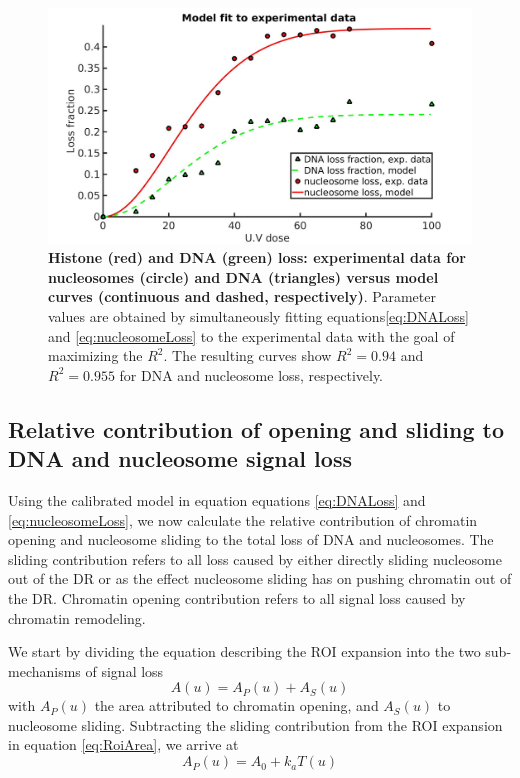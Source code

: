 \documentclass[12pt]{article}
\begin{document}
	
\begin{figure}[H]
\centering
\includegraphics[width=0.5\linewidth, height=0.3\textheight]{histoneAndDnaVsUvDoseModelFit}
\caption{\textbf{Histone (red) and DNA (green) loss: experimental data
	for nucleosomes (circle) and DNA (triangles) versus model curves
	(continuous and dashed, respectively)}. Parameter values are obtained
	by simultaneously fitting equations\eqref{eq:DNALoss}  and \eqref{eq:nucleosomeLoss} to the experimental data with
	the goal of maximizing the $R^2$. The resulting curves show $R^2 = 0.94$ and
	$R^2 = 0.955$ for DNA and nucleosome loss, respectively.}
\label{fig:histoneAndDnaVsUvDoseModelFit}
\end{figure}

\subsection{Relative contribution of opening and sliding to DNA
	and nucleosome signal loss}

Using the calibrated model in equation equations \eqref{eq:DNALoss}  and \eqref{eq:nucleosomeLoss}, we now calculate the
relative contribution of chromatin opening and nucleosome sliding to the
total loss of DNA and nucleosomes. The sliding contribution refers to all loss
caused by either directly sliding nucleosome out of the DR or as the effect
nucleosome sliding has on pushing chromatin out of the DR. Chromatin opening contribution refers to all signal loss caused by chromatin remodeling.

We start by dividing the equation describing the ROI expansion into the
two sub-mechanisms of signal loss
\begin{equation*}
A(u) = A_P(u) +A_S(u)
\end{equation*}
with $A_P(u)$ the area attributed to chromatin opening, and $A_S(u)$ to nucleosome sliding. Subtracting the sliding contribution from the ROI expansion
in equation \eqref{eq:RoiArea}, we arrive at
\begin{equation*}
A_P(u) = A_0 + k_aT(u)
\end{equation*}
\end{document}
